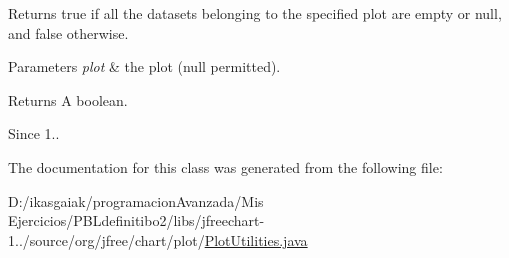 Returns {\ttfamily true} if all the datasets belonging to the specified plot are empty or {\ttfamily null}, and {\ttfamily false} otherwise.


\begin{DoxyParams}{Parameters}
{\em plot} & the plot ({\ttfamily null} permitted).\\
\hline
\end{DoxyParams}
\begin{DoxyReturn}{Returns}
A boolean.
\end{DoxyReturn}
\begin{DoxySince}{Since}
1.. 
\end{DoxySince}


The documentation for this class was generated from the following file\+:\begin{DoxyCompactItemize}
\item 
D\+:/ikasgaiak/programacion\+Avanzada/\+Mis Ejercicios/\+P\+B\+Ldefinitibo2/libs/jfreechart-\/1../source/org/jfree/chart/plot/\mbox{\hyperlink{_plot_utilities_8java}{Plot\+Utilities.\+java}}\end{DoxyCompactItemize}

